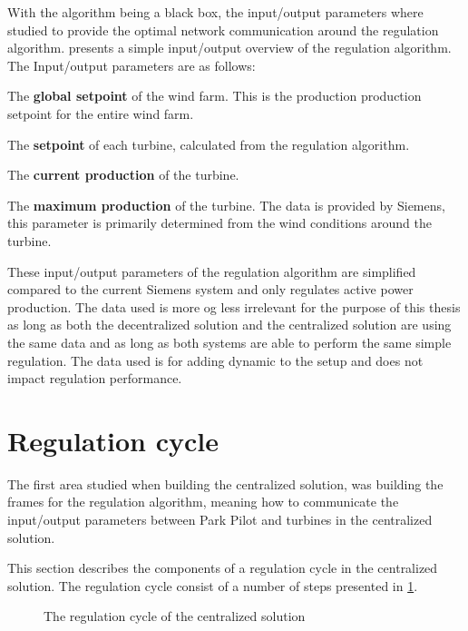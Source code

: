 With the algorithm being a black box, the input/output parameters where studied to provide the optimal network communication around the regulation algorithm.  presents a simple input/output overview of the regulation algorithm. The Input/output parameters are as follows:

\begin{description}
	\item The \textbf{global setpoint} of the wind farm. This is the production production setpoint for the entire wind farm. %
	\item The \textbf{setpoint} of each turbine, calculated from the regulation algorithm. 
	\item The \textbf{current production} of the turbine.
	\item The \textbf{maximum production} of the turbine. The data is provided by Siemens, this parameter is primarily determined from the wind conditions around the turbine.
\end{description}

These input/output parameters of the regulation algorithm are simplified compared to the current Siemens system and only regulates active power production. The data used is more og less irrelevant for the purpose of this thesis as long as both the decentralized solution and the centralized solution are using the same data and as long as both systems are able to perform the same simple regulation.
The data used is for adding dynamic to the setup and does not impact regulation performance.

\section{Regulation cycle}\label{sec:currentSystemCen} 

The first area studied when building the centralized solution, was building the frames for the regulation algorithm, meaning how to communicate the input/output parameters between Park Pilot and turbines in the centralized solution.

This section describes the components of a regulation cycle in the centralized solution. The regulation cycle consist of a number of steps presented in \cref{fig:timingCentral}.

\begin{figure}[!h]
	
	\caption{The regulation cycle of the centralized solution}
	\label{fig:timingCentral}
\end{figure}

